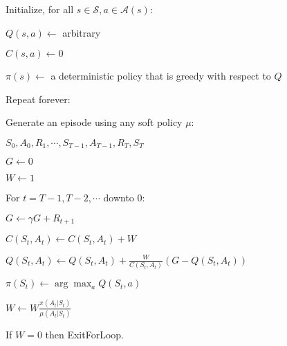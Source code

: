\documentclass[11pt,a4paper]{article}
\def\S{{\mathcal S}}
\def\A{{\mathcal A}}
\begin{document}
\begin{tcolorbox}
Initialize, for all $s\in \S, a\in \A(s)$:\par 
\hspace{1cm} $Q(s,a) \leftarrow$ arbitrary \par 
\hspace{1cm} $C(s,a) \leftarrow 0$ \par 
\hspace{1cm} $\pi(s) \leftarrow$ a deterministic policy that is greedy with respect to $Q$ \par 

Repeat forever: \par 
\hspace{1cm} Generate an episode using any soft policy $\mu$: \par 
\hspace{2cm} $S_0,A_0,R_1,\cdots, S_{T-1},A_{T-1},R_T,S_T$ \par 
\hspace{1cm} $G \leftarrow 0$ \par 
\hspace{1cm} $W \leftarrow 1$ \par 
\hspace{1cm} For $t = T-1, T-2, \cdots$ downto $0$:\par 
\hspace{2cm} $G \leftarrow \gamma G + R_{t+1}$\par
\hspace{2cm} $C(S_t,A_t) \leftarrow C(S_t,A_t) + W$ \par 
\hspace{2cm} $Q(S_t,A_t) \leftarrow Q(S_t,A_t) + \frac{W}{C(S_t,A_t)}(G - Q(S_t,A_t))$ \par 
\hspace{2cm} $\pi(S_t) \leftarrow \arg\max_a Q(S_t,a)$ \par
\hspace{2cm} $W \leftarrow W \frac{\pi(A_t|S_t)}{\mu(A_t|S_t)}$ \par
\hspace{2cm} If $W = 0$ then ExitForLoop.
\end{tcolorbox}
\end{document}
